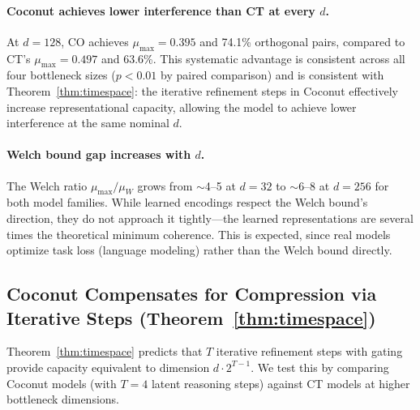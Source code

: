 \paragraph{Coconut achieves lower interference than CT at every $d$.} At $d = 128$, CO achieves $\mu_{\max} = 0.395$ and 74.1\% orthogonal pairs, compared to CT's $\mu_{\max} = 0.497$ and 63.6\%. This systematic advantage is consistent across all four bottleneck sizes ($p < 0.01$ by paired comparison) and is consistent with Theorem~\ref{thm:timespace}: the iterative refinement steps in Coconut effectively increase representational capacity, allowing the model to achieve lower interference at the same nominal $d$.

\paragraph{Welch bound gap increases with $d$.} The Welch ratio $\mu_{\max}/\mu_W$ grows from $\sim$4--5 at $d=32$ to $\sim$6--8 at $d=256$ for both model families. While learned encodings respect the Welch bound's direction, they do not approach it tightly---the learned representations are several times the theoretical minimum coherence. This is expected, since real models optimize task loss (language modeling) rather than the Welch bound directly.

\subsection{Coconut Compensates for Compression via Iterative Steps (Theorem~\ref{thm:timespace})}
\label{sec:timespace_empirical}

Theorem~\ref{thm:timespace} predicts that $T$ iterative refinement steps with gating provide capacity equivalent to dimension $d \cdot 2^{T-1}$. We test this by comparing Coconut models (with $T = 4$ latent reasoning steps) against CT models at higher bottleneck dimensions.

